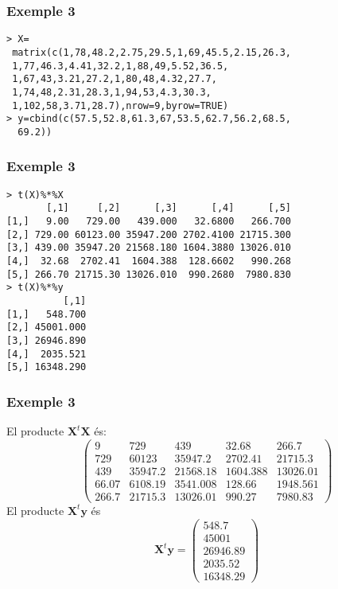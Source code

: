 \documentclass[12pt,t]{beamer}
\theoremstyle{plain}
\theoremstyle{definition}
\begin{document}
\begin{frame}[fragile]
\frametitle{Exemple 3}
\vspace*{-2ex}

\small 
\begin{verbatim}
> X=
 matrix(c(1,78,48.2,2.75,29.5,1,69,45.5,2.15,26.3,
 1,77,46.3,4.41,32.2,1,88,49,5.52,36.5,
 1,67,43,3.21,27.2,1,80,48,4.32,27.7,
 1,74,48,2.31,28.3,1,94,53,4.3,30.3,
 1,102,58,3.71,28.7),nrow=9,byrow=TRUE)
> y=cbind(c(57.5,52.8,61.3,67,53.5,62.7,56.2,68.5,
  69.2))
\end{verbatim}
\end{frame}

\begin{frame}[fragile]
\frametitle{Exemple 3}
\vspace*{-2ex}

\small
\begin{verbatim}
> t(X)%*%X
       [,1]     [,2]      [,3]      [,4]      [,5]
[1,]   9.00   729.00   439.000   32.6800   266.700
[2,] 729.00 60123.00 35947.200 2702.4100 21715.300
[3,] 439.00 35947.20 21568.180 1604.3880 13026.010
[4,]  32.68  2702.41  1604.388  128.6602   990.268
[5,] 266.70 21715.30 13026.010  990.2680  7980.830
> t(X)%*%y
          [,1]
[1,]   548.700
[2,] 45001.000
[3,] 26946.890
[4,]  2035.521
[5,] 16348.290
\end{verbatim}
\end{frame}


\begin{frame}
\frametitle{Exemple 3}
El producte $\mathbf{X}^t\mathbf{X}$ és:
$$
\left(
\begin{array}{ccccc}
9& 729& 439& 32.68 & 266.7 \\
729& 60123& 35947.2& 2702.41& 21715.3\\
439& 35947.2& 21568.18& 1604.388& 13026.01\\
66.07 & 6108.19 & 3541.008& 128.66& 1948.561\\
266.7& 21715.3&13026.01& 990.27& 7980.83
\end{array}
\right)
$$
El producte $\mathbf{X}^t\mathbf{y}$ és
$$
\mathbf{X}^t\mathbf{y} = \left(
\begin{array}{c}
548.7\\ 45001\\ 26946.89\\ 2035.52\\ 16348.29
\end{array}
\right)
$$
\end{frame}
\end{document}
